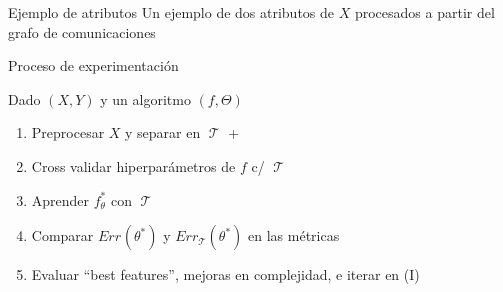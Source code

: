 \documentclass[xcolor=x11names]{beamer}
\DeclareMathOperator{\trainset}{\mathcal{T}}
\DeclareMathOperator{\testset}{\mathcal{T_s}}
\begin{document}
\begin{frame}{Ejemplo de atributos}
Un ejemplo de dos atributos de $X$ procesados a partir del grafo de comunicaciones
	\begin{table}[ht]
		\small
		\centering
	\end{table}
\end{frame}



\begin{frame}{ Proceso de experimentación }

Dado $(X,Y)$ y un algoritmo $\left( f, \Theta \right)  $
	\begin{enumerate}[I]
		\item Preprocesar $X$ y separar en $\trainset$ + $\testset$
		\item Cross validar hiperparámetros de $f$ c/ $\trainset$
		\item Aprender $f_\theta^*$ con $\trainset$
		\item Comparar  $Err_{\testset}(\theta^*)$ y  $Err_{\trainset}(\theta^*)$ en las métricas
		\item Evaluar ``best features'', mejoras en complejidad, e iterar en (I)
	\end{enumerate}

\end{frame}
\end{document}
